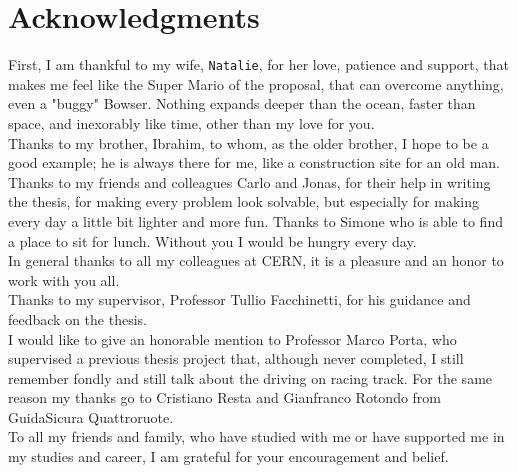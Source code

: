 \chapter*{Acknowledgments}

First, I am thankful to my wife, \texttt{Natalie}, for her love, patience and support, that makes me feel like the Super Mario of the proposal, that can overcome anything, even a "buggy" Bowser. Nothing expands deeper than the ocean, faster than space, and inexorably like time, other than my love for you.\\
Thanks to my brother, Ibrahim, to whom, as the older brother, I hope to be a good example; he is always there for me, like a construction site for an old man.
Thanks to my friends and colleagues Carlo and Jonas, for their help in writing the thesis, for making every problem look solvable, but especially for making every day a little bit lighter and more fun. 
Thanks to Simone who is able to find a place to sit for lunch. Without you I would be hungry every day.\\
In general thanks to all my colleagues at CERN, it is a pleasure and an honor to work with you all.\\
Thanks to my supervisor, Professor Tullio Facchinetti, for his guidance and feedback on the thesis.\\
I would like to give an honorable mention to Professor Marco Porta, who supervised a previous thesis project that, although never completed, I still remember fondly and still talk about the driving on racing track. For the same reason my thanks go to Cristiano Resta and Gianfranco Rotondo from GuidaSicura Quattroruote.\\
To all my friends and family, who have studied with me or have supported me in my studies and career, I am grateful for your encouragement and belief.\\

\thispagestyle{empty}
\mbox{}
\newpage
